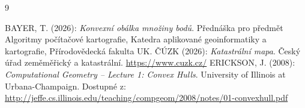 \documentclass[11pt, a4paper]{article}
\begin{document}
\newpage
\renewcommand{\refname}{Zdroje} 
\begin{thebibliography}{9}

 BAYER, T. (2026): \textit{Konvexní obálka množiny bodů}. Přednáška pro předmět Algoritmy počítačové kartografie, Katedra aplikované geoinformatiky a kartografie, Přírodovědecká fakulta UK.
 ČÚZK (2026): \textit{Katastrální mapa}. Český úřad zeměměřický a katastrální. \url{https://www.cuzk.cz/}
 ERICKSON, J. (2008): \textit{Computational Geometry -- Lecture 1: Convex Hulls}. University of Illinois at Urbana-Champaign. Dostupné z: \url{http://jeffe.cs.illinois.edu/teaching/compgeom/2008/notes/01-convexhull.pdf}
\end{thebibliography}
\end{document}
